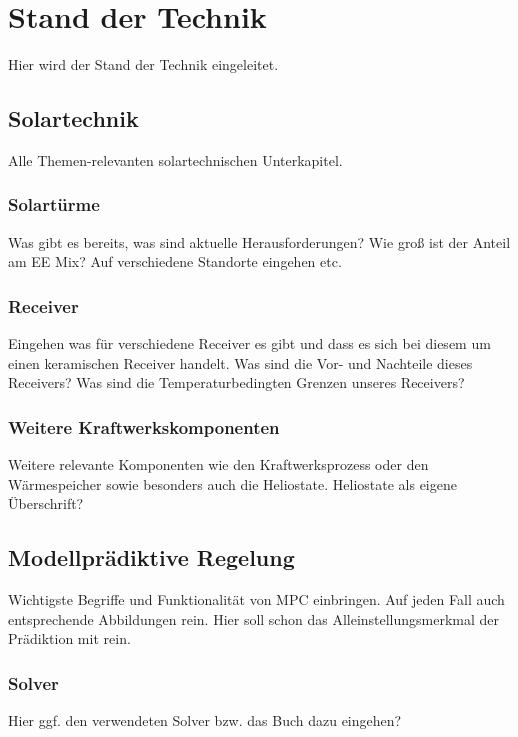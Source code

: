 \chapter{Stand der Technik} \label{ch_StandTechnik}
Hier wird der Stand der Technik eingeleitet.

\section{Solartechnik} \label{sec_Solartechnik}
Alle Themen-relevanten solartechnischen Unterkapitel.

\subsection{Solartürme} \label{subsec_Solartürme}
Was gibt es bereits, was sind aktuelle Herausforderungen?
Wie groß ist der Anteil am EE Mix?
Auf verschiedene Standorte eingehen etc.

\subsection{Receiver} \label{subsec_Receiver}
Eingehen was für verschiedene Receiver es gibt und dass es sich bei diesem um einen keramischen Receiver handelt.
Was sind die Vor- und Nachteile dieses Receivers?
Was sind die Temperaturbedingten Grenzen unseres Receivers?

\subsection{Weitere Kraftwerkskomponenten} \label{subsec_WeitereKomponenten}
Weitere relevante Komponenten wie den Kraftwerksprozess oder den Wärmespeicher sowie besonders auch die Heliostate.
Heliostate als eigene Überschrift?

\section{Modellprädiktive Regelung} \label{sec_ModellprädiktiveRegelung}
Wichtigste Begriffe und Funktionalität von MPC einbringen.
Auf jeden Fall auch entsprechende Abbildungen rein.
Hier soll schon das Alleinstellungsmerkmal der Prädiktion mit rein.

\subsection{Solver} \label{subsec_Solver}
Hier ggf. den verwendeten Solver bzw. das Buch dazu eingehen? \cite{Follinger.2016}

